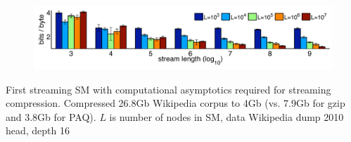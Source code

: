 \documentclass{beamer}
\begin{document}
\begin{frame}[t]{}
\begin{figure}[htbp]
\begin{center}
\includegraphics[width=\textwidth]{../figs/varying_stream_length.pdf}
\end{center}
\end{figure}
First streaming SM with computational asymptotics required for streaming compression.  Compressed 26.8Gb Wikipedia corpus to 4Gb (vs. 7.9Gb for gzip and 3.8Gb for PAQ).\newline
\vspace{3cm}
{\tiny $L$ is number of nodes in SM, data Wikipedia dump 2010 head, depth 16}
\end{frame}
\end{document}

